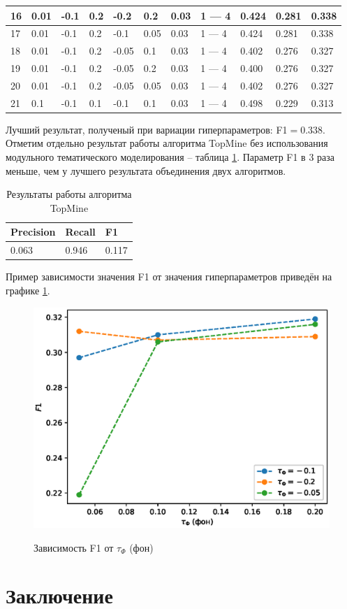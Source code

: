\documentclass[a4paper, 12pt]{article}
\begin{document}
\begin{table}[!ht]
\begin{tabular}{|l|l|l|l|l|l|l|p{50 pt}|l|l|l|}
        \rowcolor{Gray}
        16 & 0.01 & -0.1 & 0.2 & -0.2 & 0.2 & 0.03 & 1 — 4 & 0.424 & 0.281 & 0.338 \\ \hline
        \rowcolor{Gray}
        17 & 0.01 & -0.1 & 0.2 & -0.1 & 0.05 & 0.03 & 1 — 4 & 0.424 & 0.281 & 0.338 \\ \hline
        18 & 0.01 & -0.1 & 0.2 & -0.05 & 0.1 & 0.03 & 1 — 4 & 0.402 & 0.276 & 0.327 \\ \hline
        19 & 0.01 & -0.1 & 0.2 & -0.05 & 0.2 & 0.03 & 1 — 4 & 0.400 & 0.276 & 0.327 \\ \hline
        20 & 0.01 & -0.1 & 0.2 & -0.05 & 0.05 & 0.03 & 1 — 4 & 0.402 & 0.276 & 0.327 \\ \hline
        21 & 0.1 & -0.1 & 0.1 & -0.1 & 0.1 & 0.03 & 1 — 4 & 0.498 & 0.229 & 0.313 \\
        \hline
    \end{tabular}
\end{table}

    Лучший результат, полученый при вариации гиперпараметров: F1$= 0.338$. Отметим отдельно результат работы алгоритма TopMine без использования модульного тематического моделирования -- таблица \ref{table:TopMine}. Параметр F1 в 3 раза меньше, чем у лучшего результата объединения двух алгоритмов.

    \begin{table}[!ht]
    \caption{Результаты работы алгоритма TopMine}
    \label{table:TopMine}
    \centering\medskip
    \begin{tabular}{|l|l|l|}
    \hline
        Precision & Recall & F1 \\ \hline
        0.063 & 0.946 & 0.117 \\
        \hline
    \end{tabular}
\end{table}

    Пример зависимости значения F1 от значения гиперпараметров приведён на графике \ref{fg:Res}.

    \begin{figure}[!ht]
    {\includegraphics[scale = 1.0]{Pictures/Results.eps}}
    \caption{Зависимость F1 от $\tau_{\Phi}$ (фон)}
    \label{fg:Res}
\end{figure}

\section{Заключение}



\end{document}
